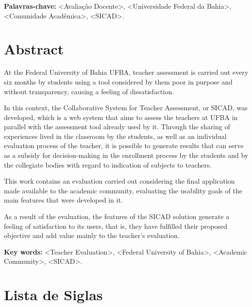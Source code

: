 \documentclass[12pt, a4paper]{report}
\begin{document}
\textbf{Palavras-chave:} <Avaliação Docente>, <Universidade Federal da Bahia>, <Comunidade Acadêmica>, <SICAD>.
\thispagestyle{empty} 

\newpage
\chapter*{Abstract}
At the Federal University of Bahia \ac{UFBA}, teacher assessment is carried out every six months by students using a tool considered by them poor in purpose and without transparency, causing a feeling of dissatisfaction.

In this context, the Collaborative System for Teacher Assessment, or SICAD, was developed, which is a web system that aims to assess the teachers at \ac{UFBA} in parallel with the assessment tool already used by it. Through the sharing of experiences lived in the classroom by the students, as well as an individual evaluation process of the teacher, it is possible to generate results that can serve as a subsidy for decision-making in the enrollment process by the students and by the collegiate bodies with regard to indication of subjects to teachers.

This work contains an evaluation carried out considering the final application made available to the academic community, evaluating the usability goals of the main features that were developed in it.

As a result of the evaluation, the features of the \ac{SICAD} solution generate a feeling of satisfaction to its users, that is, they have fulfilled their proposed objective and add value mainly to the teacher's evaluation. 

\textbf{Key words:} <Teacher Evaluation>, <Federal University of Bahia>, <Academic Community>, <SICAD>.
\thispagestyle{empty} 


\listoffigures
\cleardoublepage


\listoftables
\cleardoublepage

\newpage
\tableofcontents
\thispagestyle{empty}


\chapter*{Lista de Siglas}
\end{document}
